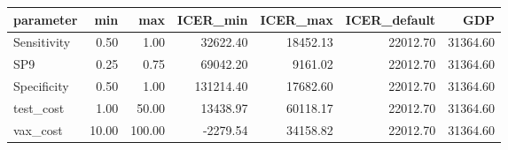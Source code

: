 \begin{tabular}{lrrrrrr}
  \hline
parameter & min & max & ICER\_min & ICER\_max & ICER\_default & GDP \\ 
  \hline
Sensitivity & 0.50 & 1.00 & 32622.40 & 18452.13 & 22012.70 & 31364.60 \\ 
  SP9 & 0.25 & 0.75 & 69042.20 & 9161.02 & 22012.70 & 31364.60 \\ 
  Specificity & 0.50 & 1.00 & 131214.40 & 17682.60 & 22012.70 & 31364.60 \\ 
  test\_cost & 1.00 & 50.00 & 13438.97 & 60118.17 & 22012.70 & 31364.60 \\ 
  vax\_cost & 10.00 & 100.00 & -2279.54 & 34158.82 & 22012.70 & 31364.60 \\ 
   \hline
\end{tabular}
